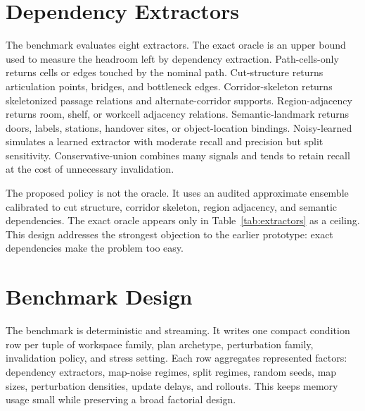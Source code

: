 \documentclass{article}
\begin{document}
\section{Dependency Extractors}

The benchmark evaluates eight extractors. The exact oracle is an upper bound used to measure the headroom left by dependency extraction. Path-cells-only returns cells or edges touched by the nominal path. Cut-structure returns articulation points, bridges, and bottleneck edges. Corridor-skeleton returns skeletonized passage relations and alternate-corridor supports. Region-adjacency returns room, shelf, or workcell adjacency relations. Semantic-landmark returns doors, labels, stations, handover sites, or object-location bindings. Noisy-learned simulates a learned extractor with moderate recall and precision but split sensitivity. Conservative-union combines many signals and tends to retain recall at the cost of unnecessary invalidation.

The proposed policy is not the oracle. It uses an audited approximate ensemble calibrated to cut structure, corridor skeleton, region adjacency, and semantic dependencies. The exact oracle appears only in Table~\ref{tab:extractors} as a ceiling. This design addresses the strongest objection to the earlier prototype: exact dependencies make the problem too easy.

\section{Benchmark Design}

The benchmark is deterministic and streaming. It writes one compact condition row per tuple of workspace family, plan archetype, perturbation family, invalidation policy, and stress setting. Each row aggregates represented factors: dependency extractors, map-noise regimes, split regimes, random seeds, map sizes, perturbation densities, update delays, and rollouts. This keeps memory usage small while preserving a broad factorial design.

\begin{table}[t]
\centering
\resizebox{\linewidth}{!}{}
\caption{Full-scale benchmark size. Compact rows are streamed to disk; the represented trial count includes extractors, noises, splits, seeds, map sizes, densities, update delays, and rollouts.}
\label{tab:scale}
\end{table}
\end{document}
